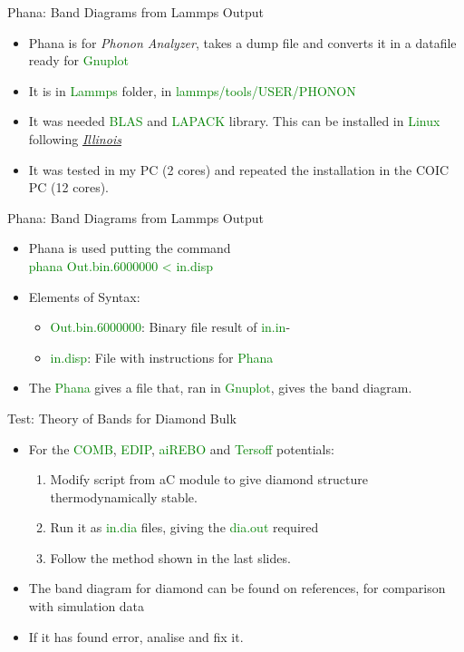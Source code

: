 \documentclass[11pt]{beamer}
\begin{document}
\begin{frame}{Phana: Band Diagrams from Lammps Output}
  \begin{itemize}
    \item Phana is for \textit{Phonon Analyzer}, takes a dump file and converts it in a datafile ready for \textcolor{green}{Gnuplot}
    \item It is in \textcolor{green}{Lammps} folder, in \textcolor{green}{lammps/tools/USER/PHONON}
    \item It was needed \textcolor{green}{BLAS} and \textcolor{green}{LAPACK} library. This can be installed in \textcolor{green}{Linux} following \hyperlink{http://www.ifp.illinois.edu/grouper/clapack.html}{\textit{Illinois}}
    \item It was tested in my PC (2 cores) and repeated the installation in the COIC PC (12 cores).
 \end{itemize}
\end{frame}
\begin{frame}{Phana: Band Diagrams from Lammps Output}
  \begin{itemize}
    \item Phana is used putting the command 
    \\ \textcolor{green}{phana Out.bin.6000000 < in.disp}
    \item Elements of Syntax:
    \begin{itemize}
        \item \textcolor{green}{Out.bin.6000000}: Binary file result of \textcolor{green}{in.in}-
        \item \textcolor{green}{in.disp}: File with instructions for \textcolor{green}{Phana}
    \end{itemize}
    \item The \textcolor{green}{Phana} gives a file that, ran in \textcolor{green}{Gnuplot}, gives the band diagram.
 \end{itemize}
\end{frame}
\begin{frame}{Test: Theory of Bands for Diamond Bulk}
  \begin{itemize}
    \item For the \textcolor{green}{COMB}, \textcolor{green}{EDIP}, \textcolor{green}{aiREBO} and \textcolor{green}{Tersoff} potentials:
    \begin{enumerate}
        \item Modify script from aC module to give diamond structure thermodynamically stable.
        \item Run it as \textcolor{green}{in.dia} files, giving the \textcolor{green}{dia.out} required
        \item Follow the method shown in the last slides.
    \end{enumerate}
    \item The band diagram for diamond can be found on references, for comparison with simulation data
    \item If it has found error, analise and fix it.
 \end{itemize}
\end{frame}
\end{document}
